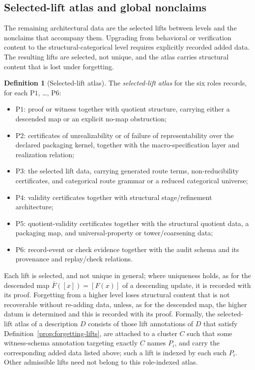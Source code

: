 \documentclass[11pt]{article}
\theoremstyle{definition}
\newtheorem{definition}[theorem]{Definition}
\newcommand{\Pone}{\ensuremath{\mathrm{P1}}}
\newcommand{\Ptwo}{\ensuremath{\mathrm{P2}}}
\newcommand{\Pthree}{\ensuremath{\mathrm{P3}}}
\newcommand{\Pfour}{\ensuremath{\mathrm{P4}}}
\newcommand{\Pfive}{\ensuremath{\mathrm{P5}}}
\newcommand{\Psix}{\ensuremath{\mathrm{P6}}}
\begin{document}
\subsection{Selected-lift atlas and global nonclaims}\label{subsec:lift-atlas}

The remaining architectural data are the selected lifts between levels
and the nonclaims that accompany them. Upgrading from behavioral or
verification content to the structural-categorical level requires
explicitly recorded added data. The resulting lifts are selected, not
unique, and the atlas carries structural content that is lost under
forgetting.

\begin{definition}[Selected-lift atlas]\label{def:selected-lift-atlas}
The \emph{selected-lift atlas} for the six roles records, for each
\Pone{}, \ldots, \Psix{}:
\begin{itemize}[topsep=2pt,itemsep=1pt]
  \item \Pone{}: proof or witness together with quotient structure, carrying
    either a descended map or an explicit no-map obstruction;
  \item \Ptwo{}: certificates of unrealizability or of failure of
    representability over the declared packaging kernel, together with the macro-specification layer and realization relation;
  \item \Pthree{}: the selected lift data,
    carrying generated route terms, non-reducibility certificates, and
    categorical route grammar or a reduced categorical universe;
  \item \Pfour{}: validity certificates together with structural
    stage/refinement architecture;
  \item \Pfive{}: quotient-validity certificates together with the
    structural quotient data, a packaging map, and universal-property or
    tower/coarsening data;
  \item \Psix{}: record-event or check evidence together with the audit
    schema and its provenance and replay/check relations.
\end{itemize}
Each lift is selected, and not unique in general; where uniqueness holds, as
for the descended map \(\bar F([x])=[F(x)]\) of a descending update, it is
recorded with its proof. Forgetting from a higher level
loses structural content that is not recoverable without re-adding data,
unless, as for the descended map, the higher datum is determined and this is
recorded with its proof. Formally, the selected-lift atlas of a description
\(D\) consists of those lift annotations of \(D\) that satisfy
Definition~\ref{prop:forgetting-lifts}, are attached to a cluster \(C\) such that
some witness-schema annotation targeting exactly \(C\) names \(P_i\), and carry
the corresponding added data listed above; such a lift is indexed by each such
\(P_i\). Other admissible lifts need
not belong to this role-indexed atlas.
\end{definition}
\end{document}
